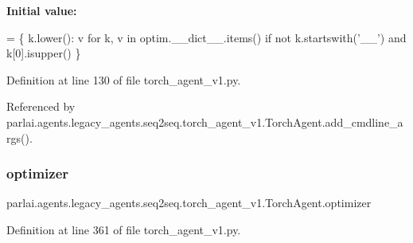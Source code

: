 {\bfseries Initial value\+:}
\begin{DoxyCode}
=  \{
        k.lower(): v
        \textcolor{keywordflow}{for} k, v \textcolor{keywordflow}{in} optim.\_\_dict\_\_.items()
        \textcolor{keywordflow}{if} \textcolor{keywordflow}{not} k.startswith(\textcolor{stringliteral}{'\_\_'}) \textcolor{keywordflow}{and} k[0].isupper()
    \}
\end{DoxyCode}


Definition at line 130 of file torch\+\_\+agent\+\_\+v1.\+py.



Referenced by parlai.\+agents.\+legacy\+\_\+agents.\+seq2seq.\+torch\+\_\+agent\+\_\+v1.\+Torch\+Agent.\+add\+\_\+cmdline\+\_\+args().

\mbox{\label{classparlai_1_1agents_1_1legacy__agents_1_1seq2seq_1_1torch__agent__v1_1_1TorchAgent_a2524bfb4b01626290e6fa26be52f2a80}} 
\subsubsection{\texorpdfstring{optimizer}{optimizer}}
{\footnotesize\ttfamily parlai.\+agents.\+legacy\+\_\+agents.\+seq2seq.\+torch\+\_\+agent\+\_\+v1.\+Torch\+Agent.\+optimizer}



Definition at line 361 of file torch\+\_\+agent\+\_\+v1.\+py.



